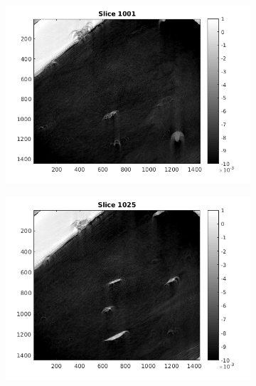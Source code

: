 \documentclass[10pt,a4paper,titlepage]{article}
\begin{document}
		\begin{figure}[H]
		
        \centering
        \begin{subfigure}[b]{0.475\textwidth}
            \centering
            \includegraphics[width=\textwidth]{no0pad/slice1001.png}
            \label{fig:mean and std of net14}
        \end{subfigure}
        \hfill
        \begin{subfigure}[b]{0.475\textwidth}  
            \centering 
            \includegraphics[width=\textwidth]{no0pad/slice1025.png}
            \label{fig:mean and std of net24}

\end{subfigure}
\end{figure}
\end{document}
